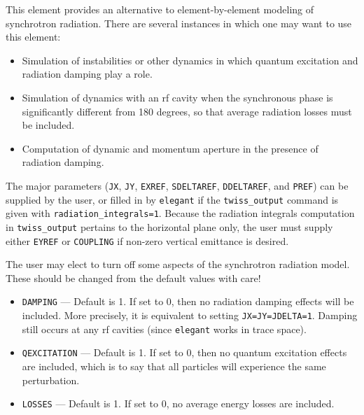 This element provides an alternative to element-by-element modeling of synchrotron radiation.
There are several instances in which one may want to use this element:
\begin{itemize}
\item Simulation of instabilities or other dynamics in which quantum excitation and radiation
  damping play a role.
\item Simulation of dynamics with an rf cavity when the synchronous phase is significantly
  different from 180 degrees, so that average radiation losses must be included.
\item Computation of dynamic and momentum aperture in the presence of radiation damping.
\end{itemize}

The major parameters (\verb|JX|, \verb|JY|, \verb|EXREF|, \verb|SDELTAREF|,
\verb|DDELTAREF|, and \verb|PREF|) can be supplied by the user, or filled in by {\tt elegant}
if the \verb|twiss_output| command is given with \verb|radiation_integrals=1|.
Because the radiation integrals computation in \verb|twiss_output| pertains to the
horizontal plane only, the user must supply either \verb|EYREF| or \verb|COUPLING| if
non-zero vertical emittance is desired.

The user may elect to turn off some aspects of the synchrotron radiation model.  These should be
changed from the default values with care!
\begin{itemize}
\item \verb|DAMPING| --- Default is 1.  If set to 0, then no radiation damping effects will be included.
  More precisely, it is equivalent to setting \verb|JX=JY=JDELTA=1|.  Damping still occurs at any
  rf cavities (since {\tt elegant} works in trace space).
\item \verb|QEXCITATION| --- Default is 1.  If set to 0, then no quantum excitation effects are included,
  which is to say that all particles will experience the same perturbation.  
\item \verb|LOSSES| --- Default is 1.  If set to 0, no average energy losses are included.
\end{itemize}
  

